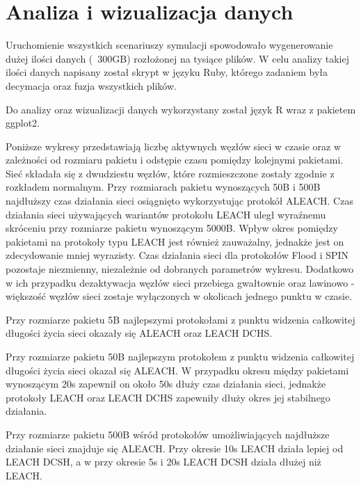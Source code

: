 \section{Analiza i wizualizacja danych}
Uruchomienie wszystkich scenariuszy symulacji spowodowało wygenerowanie dużej ilości danych (~300GB) rozłożonej na tysiące plików. W celu analizy takiej ilości danych napisany został skrypt w języku Ruby, którego zadaniem była decymacja oraz fuzja wszystkich plików.

Do analizy oraz wizualizacji danych wykorzystany został język R wraz z pakietem ggplot2.

Poniższe wykresy przedstawiają liczbę aktywnych węzłów sieci w czasie oraz w zależności od rozmiaru pakietu i odstępie czasu pomiędzy kolejnymi pakietami. Sieć składała się z dwudziestu węzłów, które rozmieszczone zostały zgodnie z rozkładem normalnym.
Przy rozmiarach pakietu wynoszących 50B i 500B najdłuższy czas działania sieci osiągnięto wykorzystując protokół ALEACH. Czas działania sieci używających wariantów protokołu LEACH uległ wyraźnemu skróceniu przy rozmiarze pakietu wynoszącym 5000B. Wpływ okres pomiędzy pakietami na protokoły typu LEACH jest również zauważalny, jednakże jest on zdecydowanie mniej wyrazisty. Czas działania sieci dla protokołów Flood i SPIN pozostaje niezmienny, niezależnie od dobranych parametrów wykresu. Dodatkowo w ich przypadku dezaktywacja węzłów sieci przebiega gwałtownie oraz lawinowo - większość węzłów sieci zostaje wyłączonych w okolicach jednego punktu w czasie.

Przy rozmiarze pakietu 5B najlepszymi protokołami z punktu widzenia całkowitej długości życia sieci okazały się ALEACH oraz LEACH DCHS.

Przy rozmiarze pakietu 50B najlepszym protokołem z punktu widzenia całkowitej długości życia sieci okazał się ALEACH. W przypadku okresu między pakietami wynoszącym 20s zapewnił on około 50s dłuży czas działania sieci, jednakże protokoły LEACH oraz LEACH DCHS zapewniły dłuży okres jej stabilnego działania.

Przy rozmiarze pakietu 500B wśród protokołów umożliwiających najdłuższe działanie sieci znajduje się ALEACH. Przy okresie 10s LEACH działa lepiej od LEACH DCSH, a w przy okresie 5s i 20s LEACH DCSH działa dłużej niż LEACH.

\clearpage
\thispagestyle{empty}

